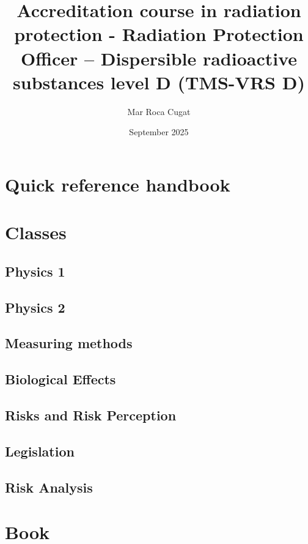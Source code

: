 \documentclass{report}
\title{Accreditation course in radiation protection - Radiation Protection Officer – Dispersible radioactive substances level D (TMS-VRS D)}
\date{September 2025}
\author{Mar Roca Cugat}
\begin{document}
\maketitle
\tableofcontents
\part{Quick reference handbook}

\setcounter{page}{1}\part{Classes}
\chapter{Physics 1}
\chapter{Physics 2}
\chapter{Measuring methods}
\chapter{Biological Effects}
\chapter{Risks and Risk Perception}
\chapter{Legislation}
\chapter{Risk Analysis}
\setcounter{chapter}{0}\setcounter{page}{1}\part{Book}
\end{document}
